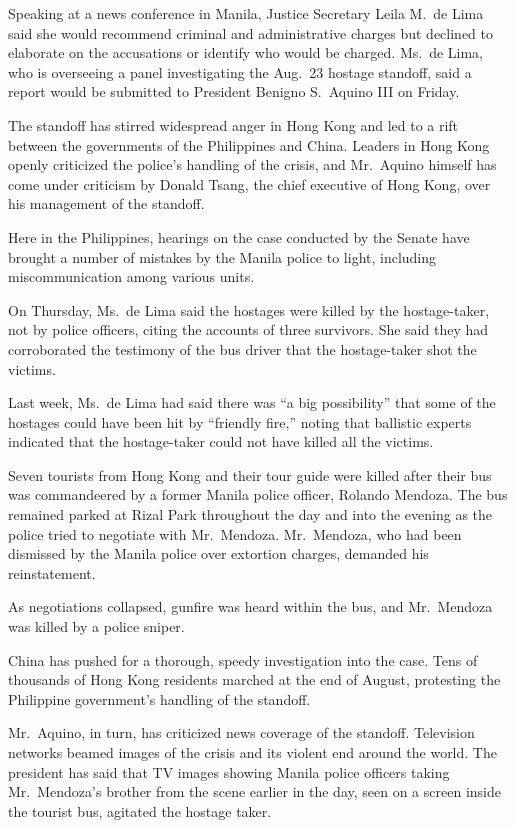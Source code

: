 ﻿\documentclass[12pt]{article}
\begin{document}
Speaking at a news conference in Manila, Justice Secretary Leila M.~de Lima said she would recommend
criminal and administrative charges but declined to elaborate on the accusations or identify who
would be charged. Ms.~de Lima, who is overseeing a panel investigating the Aug.~23 hostage standoff,
said a report would be submitted to President Benigno S.~Aquino III on Friday.

The standoff has stirred widespread anger in Hong Kong and led to a rift between the governments of
the Philippines and China. Leaders in Hong Kong openly criticized the police's handling of the
crisis, and Mr.~Aquino himself has come under criticism by Donald Tsang, the chief executive of Hong
Kong, over his management of the standoff.

Here in the Philippines, hearings on the case conducted by the Senate have brought a number of
mistakes by the Manila police to light, including miscommunication among various units.

On Thursday, Ms.~de Lima said the hostages were killed by the hostage-taker, not by police officers,
citing the accounts of three survivors. She said they had corroborated the testimony of the bus
driver that the hostage-taker shot the victims.

Last week, Ms.~de Lima had said there was ``a big possibility'' that some of the hostages could have
been hit by ``friendly fire,'' noting that ballistic experts indicated that the hostage-taker could
not have killed all the victims.

Seven tourists from Hong Kong and their tour guide were killed after their bus was commandeered by a
former Manila police officer, Rolando Mendoza. The bus remained parked at Rizal Park throughout the
day and into the evening as the police tried to negotiate with Mr.~Mendoza. Mr.~Mendoza, who had
been dismissed by the Manila police over extortion charges, demanded his reinstatement.

As negotiations collapsed, gunfire was heard within the bus, and Mr.~Mendoza was killed by a police
sniper.

China has pushed for a thorough, speedy investigation into the case. Tens of thousands of Hong Kong
residents marched at the end of August, protesting the Philippine government's handling of the
standoff.

Mr.~Aquino, in turn, has criticized news coverage of the standoff. Television networks beamed images
of the crisis and its violent end around the world. The president has said that TV images showing
Manila police officers taking Mr.~Mendoza's brother from the scene earlier in the day, seen on a
screen inside the tourist bus, agitated the hostage taker.
\end{document}
